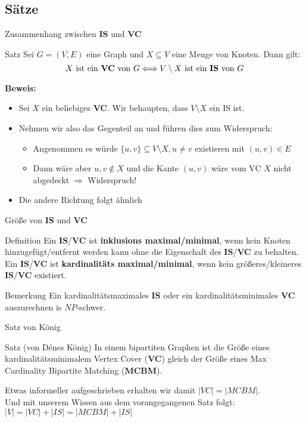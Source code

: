 \subsection{Sätze}
\begin{frame}{Zusammenhang zwischen \textbf{IS} und \textbf{VC}}
	\begin{block}{Satz}
		Sei $G=(V,E)$ eine Graph und $X\subseteq V$ eine Menge von Knoten. Dann gilt:
		\[X\text{ ist ein \textbf{VC} von $G$} \Longleftrightarrow V\setminus X\text{ ist ein \textbf{IS} von $G$}\]
	\end{block}
	\textbf{Beweis:}
	\begin{itemize}
		\item Sei $X$ ein beliebiges \textbf{VC}. Wir behaupten, dass $V\setminus X$ ein IS ist.
		\item Nehmen wir also das Gegenteil an und führen dies zum Widerspruch:
		\begin{itemize}
			\item Angenommen es würde $\{u,v\}\subseteq V\setminus X, u\neq v$ existieren mit $(u,v)\in E$
			\item Dann wäre aber $u,v\notin X$ und die Kante $(u,v)$ wäre vom VC $X$ nicht abgedeckt $\Rightarrow$ Widerspruch!
		\end{itemize}
		\item Die andere Richtung folgt ähnlich
	\end{itemize}
\end{frame}
\begin{frame}{Größe von \textbf{IS} und \textbf{VC}}
	\begin{block}{Definition}
		Ein \textbf{IS}/\textbf{VC} ist \textbf{inklusions maximal/minimal}, wenn kein Knoten hinzugefügt/entfernt werden kann ohne die Eigenschaft des \textbf{IS}/\textbf{VC} zu behalten.\\
		Ein \textbf{IS}/\textbf{VC} ist \textbf{kardinalitäts maximal/minimal}, wenn kein größeres/kleineres \textbf{IS}/\textbf{VC} existiert.
	\end{block}
	\begin{block}{Bemerkung}
		Ein kardinalitätsmaximales \textbf{IS} oder ein kardinalitätsminimales \textbf{VC} auszurechnen is $NP$-schwer.
	\end{block}
\end{frame}
\begin{frame}{Satz von König}
	\begin{block}{Satz (von Dénes König)}
		In einem bipartiten Graphen ist die Größe eines kardinalitätsminimalem Vertex Cover (\textbf{VC}) gleich der Größe eines Max Cardinality Bipartite Matching (\textbf{MCBM}).
	\end{block}
	Etwas informeller aufgeschrieben erhalten wir damit $|VC| = |MCBM|$.\\
	Und mit unserem Wissen aus dem vorangegangenen Satz folgt: $|V| = |VC| + |IS| = |MCBM| + |IS|$\\
\end{frame}

